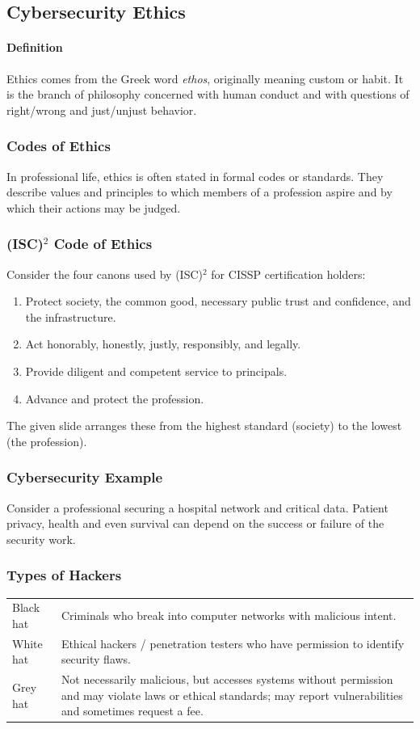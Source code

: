 \documentclass[12pt]{article}
\newcommand{\Definition}{\paragraph{Definition}}
\begin{document}
\subsection{Cybersecurity Ethics}
\Definition Ethics comes from the Greek word \textit{ethos}, originally meaning custom or habit. It is the branch of philosophy concerned with human conduct and with questions of right/wrong and just/unjust behavior.

\subsubsection{Codes of Ethics}
In professional life, ethics is often stated in formal codes or standards. They describe values and principles to which members of a profession aspire and by which their actions may be judged.

\subsubsection{(ISC)$^2$ Code of Ethics}
Consider the four canons used by (ISC)$^2$ for CISSP certification holders:
\begin{enumerate}
    \item Protect society, the common good, necessary public trust and confidence, and the infrastructure.
    \item Act honorably, honestly, justly, responsibly, and legally.
    \item Provide diligent and competent service to principals.
    \item Advance and protect the profession.
\end{enumerate}
The given slide arranges these from the highest standard (society) to the lowest (the profession).

\subsubsection{Cybersecurity Example}
Consider a professional securing a hospital network and critical data. Patient privacy, health and even survival can depend on the success or failure of the security work.

\subsubsection{Types of Hackers}
\begin{table}[H]
\centering
\begin{tabularx}{\textwidth}{lX}
\toprule
Black hat & Criminals who break into computer networks with malicious intent.\\
White hat & Ethical hackers / penetration testers who have permission to identify security flaws.\\
Grey hat & Not necessarily malicious, but accesses systems without permission and may violate laws or ethical standards; may report vulnerabilities and sometimes request a fee.\\
\bottomrule
\end{tabularx}
\end{table}
\end{document}

